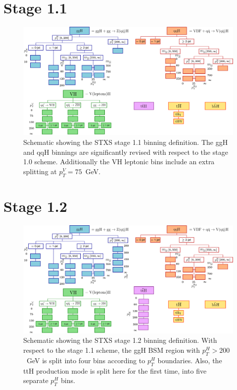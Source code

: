 \section{Stage 1.1}
\begin{figure}[htb!]
  \centering
  \includegraphics[width=.95\linewidth]{Figures/app_merging_schemes/stage1p1.pdf}
  \caption[Schematic of the STXS stage 1.1 binning scheme]
  {
    Schematic showing the STXS stage 1.1 binning definition. The ggH and qqH binnings are significantly revised with respect to the stage 1.0 scheme. Additionally the VH leptonic bins include an extra splitting at $p_T^V=75$~GeV.
  }
  \label{fig:stxs_schematic_stage1p1}
\end{figure}
\vspace{-.5cm}
\FloatBarrier
\section{Stage 1.2}
\begin{figure}[htb!]
  \centering
  \includegraphics[width=.95\linewidth]{Figures/app_merging_schemes/stage1p2.pdf}
  \caption[Schematic of the STXS stage 1.2 binning scheme]
  {
    Schematic showing the STXS stage 1.2 binning definition. With respect to the stage 1.1 scheme, the ggH BSM region with $p_T^H>200$~GeV is split into four bins according to $p_T^H$ boundaries. Also, the ttH production mode is split here for the first time, into five separate $p_T^H$ bins.
  }
  \label{fig:stxs_schematic_stage1p2}
\end{figure}
